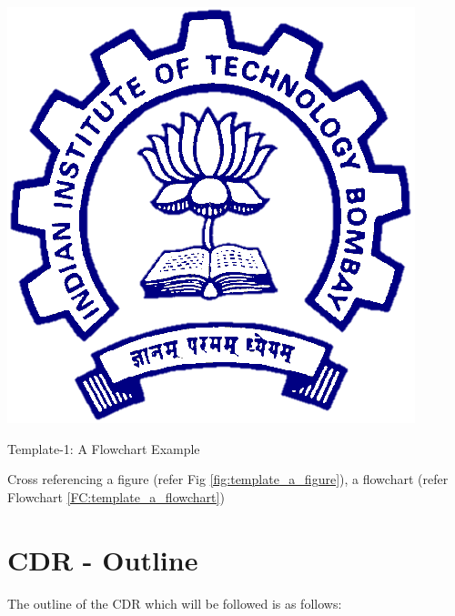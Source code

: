 \documentclass[../../main.tex]{subfiles}
\begin{document}
\begin{Flowchart}
    \centering
    \includegraphics[scale=0.3]{Figures/Foreword/iitb_logo.png}
    \caption{Template-1: A Flowchart Example}
    \label{FC:template_a_flowchart}
\end{Flowchart}


Cross referencing a figure (refer Fig \ref{fig:template_a_figure}), a flowchart (refer Flowchart \ref{FC:template_a_flowchart})





\section{CDR - Outline}
The outline of the CDR which will be followed is as follows:
\end{document}
